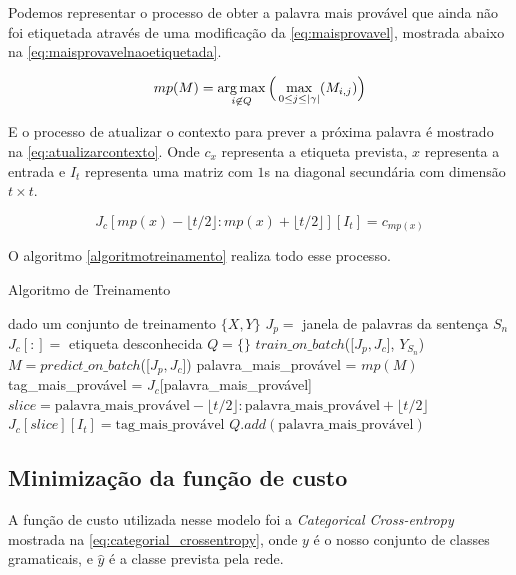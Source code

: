 Podemos representar o processo de obter a palavra mais provável que ainda não foi etiquetada através de uma modificação da \autoref{eq:maisprovavel}, mostrada abaixo na \autoref{eq:maisprovavelnaoetiquetada}.

\begin{equation}\label{eq:maisprovavelnaoetiquetada}
mp(M) = \operatorname*{arg\,max}_{i \not \in Q}\Big(\max_{0 \leq j \leq |\gamma|}(M_{i,j})\Big)
\end{equation}

E o processo de atualizar o contexto para prever a próxima palavra é mostrado na \autoref{eq:atualizarcontexto}. Onde $c_x$ representa a etiqueta prevista, $x$ representa a entrada e $I_t$ representa uma matriz com $1$s na diagonal secundária com dimensão $t \times t$.

\begin{equation}\label{eq:atualizarcontexto}
J_c[mp(x)-\lfloor t/2 \rfloor:mp(x)+\lfloor t/2 \rfloor][I_t] = c_{mp(x)}
\end{equation}

O algoritmo \ref{algoritmotreinamento} realiza todo esse processo.

\begin{algorithm}[!htb]
\caption{Algoritmo de Treinamento} \label{algoritmotreinamento}
\begin{algorithmic}[1]
  \State dado um conjunto de treinamento $\{X, Y\}$
    \State $J_p = $ janela de palavras da sentença $S_n$
    \State $J_c[:] = $ etiqueta desconhecida 
    \State $Q = \{\}$ 
      \State $train\_on\_batch$([$J_p, J_c$], $Y_{S_n}$)
      \State $M = predict\_on\_batch$([$J_p, J_c$])
      \State palavra\_mais\_provável = $mp(M)$
      \State tag\_mais\_provável = $J_c$[palavra\_mais\_provável]
      \State $slice = \mbox{palavra\_mais\_provável}-\lfloor t/2 \rfloor:\mbox{palavra\_mais\_provável}+\lfloor t/2 \rfloor$
      \State $J_c[slice][I_t] = \mbox{tag\_mais\_provável}$
      \State $Q.add(\mbox{palavra\_mais\_provável})$
    \EndWhile
  \EndFor
\EndProcedure
\end{algorithmic}
\end{algorithm}


\subsection{Minimização da função de custo}

A função de custo utilizada nesse modelo foi a \textit{Categorical Cross-entropy} mostrada na \autoref{eq:categorial_crossentropy}, onde $y$ é o nosso conjunto de classes gramaticais, e $\hat{y}$ é a classe prevista pela rede. 

